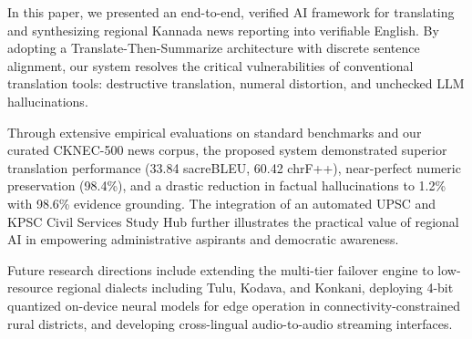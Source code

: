 \documentclass[conference]{IEEEtran}
\begin{document}
In this paper, we presented an end-to-end, verified AI framework for translating and synthesizing regional Kannada news reporting into verifiable English. By adopting a Translate-Then-Summarize architecture with discrete sentence alignment, our system resolves the critical vulnerabilities of conventional translation tools: destructive translation, numeral distortion, and unchecked LLM hallucinations. 

Through extensive empirical evaluations on standard benchmarks and our curated CKNEC-500 news corpus, the proposed system demonstrated superior translation performance (33.84 sacreBLEU, 60.42 chrF++), near-perfect numeric preservation (98.4\%), and a drastic reduction in factual hallucinations to 1.2\% with 98.6\% evidence grounding. The integration of an automated UPSC and KPSC Civil Services Study Hub further illustrates the practical value of regional AI in empowering administrative aspirants and democratic awareness.

Future research directions include extending the multi-tier failover engine to low-resource regional dialects including Tulu, Kodava, and Konkani, deploying 4-bit quantized on-device neural models for edge operation in connectivity-constrained rural districts, and developing cross-lingual audio-to-audio streaming interfaces.
\end{document}
